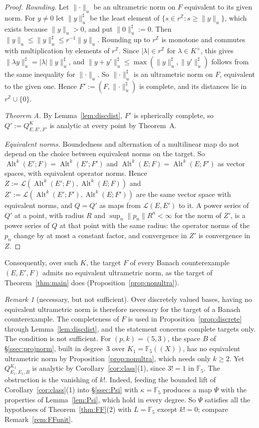 \documentclass[11pt]{amsart}
\theoremstyle{definition}
\theoremstyle{remark}
\newtheorem{remark}[theorem]{Remark}
\numberwithin{equation}{section}
\newcommand{\Z}{\mathbb{Z}}
\newcommand{\F}{\mathbb{F}}
\newcommand{\cL}{\mathcal{L}}
\newcommand{\Alt}{\operatorname{Alt}}
\newcommand{\abs}[1]{\lvert #1\rvert}
\newcommand{\norm}[1]{\lVert #1\rVert}
\begin{document}
\begin{proof}
\emph{Rounding.} Let $\norm\cdot_u$ be an ultrametric norm on $F$ equivalent to its given norm. For $y\ne0$ let
$\norm y_u^\sharp$ be the least element of $\{s\in r^\Z:s\ge\norm y_u\}$, which exists because $\norm y_u>0$, and put
$\norm0_u^\sharp:=0$. Then $\norm y_u\le\norm y_u^\sharp\le r^{-1}\norm y_u$. Rounding up to $r^\Z$ is monotone and
commutes with multiplication by elements of $r^\Z$. Since $\abs\lambda\in r^\Z$ for $\lambda\in K^\times$, this gives
$\norm{\lambda y}_u^\sharp=\abs\lambda\norm y_u^\sharp$, and
$\norm{y+y'}_u^\sharp\le\max(\norm y_u^\sharp,\norm{y'}_u^\sharp)$ follows from the same inequality for
$\norm\cdot_u$. So $\norm\cdot_u^\sharp$ is an ultrametric norm on $F$, equivalent to the given one. Hence
$F':=(F,\norm\cdot_u^\sharp)$ is complete, and its distances lie in $r^\Z\cup\{0\}$.

\emph{Theorem A.} By Lemma~\ref{lem:discdist}, $F'$ is spherically complete, so $Q':=Q^K_{E,E',F'}$ is analytic at
every point by Theorem~A.

\emph{Equivalent norms.} Boundedness and alternation of a multilinear map do not depend on the choice between
equivalent norms on the target. So $\Alt^k(E';F)=\Alt^k(E';F')$ and $\Alt^k(E;F)=\Alt^k(E;F')$ as vector spaces, with
equivalent operator norms. Hence $Z:=\cL(\Alt^k(E';F),\Alt^k(E;F))$ and $Z':=\cL(\Alt^k(E';F'),\Alt^k(E;F'))$ are the
same vector space with equivalent norms, and $Q=Q'$ as maps from $\cL(E,E')$ to it. A power series of $Q'$ at a point,
with radius $R$ and $\sup_n\norm{p_n}R^n<\infty$ for the norm of $Z'$, is a power series of $Q$ at that point with
the same radius: the operator norms of the $p_n$ change by at most a constant factor, and convergence in $Z'$ is
convergence in $Z$.
\end{proof}

Consequently, over such $K$, the target $F$ of every Banach counterexample $(E,E',F)$ admits no equivalent ultrametric
norm, as the target of Theorem~\ref{thm:main} does (Proposition~\ref{prop:nonultra}).

\begin{remark}[necessary, but not sufficient]\label{rem:notsuff}
Over discretely valued bases, having no equivalent ultrametric norm is therefore necessary for the target of a
Banach counterexample. The completeness of $F$ is used in Proposition~\ref{prop:discrete} through
Lemma~\ref{lem:discdist}, and the statement concerns complete targets only. The condition is not sufficient. For $(p,k)=(5,3)$, the space $B$ of \S\ref{ssec:projnorm}, built in degree~$3$
over $K_1=\F_5((X))$, has no equivalent ultrametric norm by Proposition~\ref{prop:nonultra}, which needs only
$k\ge2$. Yet $Q^{K_1}_{E_1,E_1,B}$ is analytic by Corollary~\ref{cor:class}(1), since $3!=1$ in $\F_5$. The
obstruction is the vanishing of $k!$. Indeed, feeding the bounded lift of Corollary~\ref{cor:class}(1) into
\S\ref{ssec:Psi} with $\kappa=\F_5$ produces a map $\Psi$ with the properties of Lemma~\ref{lem:Psi}, which hold in
every degree. So $\Psi$ satisfies all the hypotheses of Theorem~\ref{thm:FF}(2) with $L=\F_5$ except $k!=0$; compare
Remark~\ref{rem:FFunit}.
\end{remark}
\end{document}
